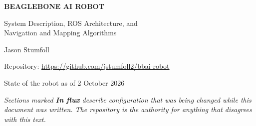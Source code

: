 \documentclass[11pt,letterpaper,oneside]{report}
\theoremstyle{definition}
\theoremstyle{remark}
\begin{document}
\begin{titlepage}
\centering
\vspace*{1.2in}
{\Large\bfseries BEAGLEBONE AI ROBOT\par}
\vspace{0.15in}
{\large System Description, ROS Architecture, and\\
Navigation and Mapping Algorithms\par}
\vspace{0.6in}
Jason Stumfoll\par
\vspace{0.2in}
{\small Repository: \url{https://github.com/jstumfoll2/bbai-robot}\par}
\vspace{0.6in}
State of the robot as of 2 October 2026\par
\vfill
{\small\itshape Sections marked \textbf{In flux} describe configuration that was
being changed while this document was written. The repository is the authority
for anything that disagrees with this text.\par}
\end{titlepage}

\tableofcontents
\listoffigures
\listoftables


















\appendix




\end{document}
